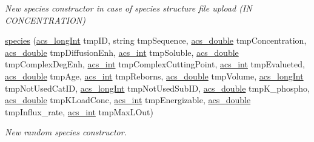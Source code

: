 \begin{DoxyCompactItemize}
\begin{DoxyCompactList}\small\item\em New species constructor in case of species structure file upload (I\-N C\-O\-N\-C\-E\-N\-T\-R\-A\-T\-I\-O\-N) \end{DoxyCompactList}\item 
\hyperlink{classspecies_a26eba3e8d86938ad8b2b6b284e9f010f}{species} (\hyperlink{acs__headers_8h_a19319d75f02db4308bc5c0026d98cd85}{acs\-\_\-long\-Int} tmp\-I\-D, string tmp\-Sequence, \hyperlink{acs__headers_8h_ab776853a005fcbf56af0424a2a4dd607}{acs\-\_\-double} tmp\-Concentration, \hyperlink{acs__headers_8h_ab776853a005fcbf56af0424a2a4dd607}{acs\-\_\-double} tmp\-Diffusion\-Enh, \hyperlink{acs__headers_8h_a8d277355641a098190360234e2ebde35}{acs\-\_\-int} tmp\-Soluble, \hyperlink{acs__headers_8h_ab776853a005fcbf56af0424a2a4dd607}{acs\-\_\-double} tmp\-Complex\-Deg\-Enh, \hyperlink{acs__headers_8h_a8d277355641a098190360234e2ebde35}{acs\-\_\-int} tmp\-Complex\-Cutting\-Point, \hyperlink{acs__headers_8h_a8d277355641a098190360234e2ebde35}{acs\-\_\-int} tmp\-Evalueted, \hyperlink{acs__headers_8h_ab776853a005fcbf56af0424a2a4dd607}{acs\-\_\-double} tmp\-Age, \hyperlink{acs__headers_8h_a8d277355641a098190360234e2ebde35}{acs\-\_\-int} tmp\-Reborns, \hyperlink{acs__headers_8h_ab776853a005fcbf56af0424a2a4dd607}{acs\-\_\-double} tmp\-Volume, \hyperlink{acs__headers_8h_a19319d75f02db4308bc5c0026d98cd85}{acs\-\_\-long\-Int} tmp\-Not\-Used\-Cat\-I\-D, \hyperlink{acs__headers_8h_a19319d75f02db4308bc5c0026d98cd85}{acs\-\_\-long\-Int} tmp\-Not\-Used\-Sub\-I\-D, \hyperlink{acs__headers_8h_ab776853a005fcbf56af0424a2a4dd607}{acs\-\_\-double} tmp\-K\-\_\-phospho, \hyperlink{acs__headers_8h_ab776853a005fcbf56af0424a2a4dd607}{acs\-\_\-double} tmp\-K\-Load\-Conc, \hyperlink{acs__headers_8h_a8d277355641a098190360234e2ebde35}{acs\-\_\-int} tmp\-Energizable, \hyperlink{acs__headers_8h_ab776853a005fcbf56af0424a2a4dd607}{acs\-\_\-double} tmp\-Influx\-\_\-rate, \hyperlink{acs__headers_8h_a8d277355641a098190360234e2ebde35}{acs\-\_\-int} tmp\-Max\-L\-Out)
\begin{DoxyCompactList}\small\item\em New random species constructor. \end{DoxyCompactList}\item 

\end{DoxyCompactItemize}
